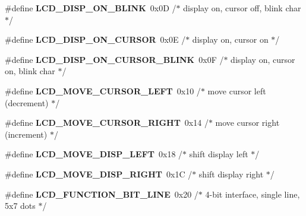 \begin{DoxyCompactItemize}
\item 
\#define {\bfseries L\+C\+D\+\_\+\+D\+I\+S\+P\+\_\+\+O\+N\+\_\+\+B\+L\+I\+NK}~0x0\+D /$\ast$ display on, cursor off, blink char     $\ast$/\hypertarget{a00010_ga470cef85de53e37356b22c66a357a764}{}\label{a00010_ga470cef85de53e37356b22c66a357a764}

\item 
\#define {\bfseries L\+C\+D\+\_\+\+D\+I\+S\+P\+\_\+\+O\+N\+\_\+\+C\+U\+R\+S\+OR}~0x0\+E /$\ast$ display on, cursor on                  $\ast$/\hypertarget{a00010_gaf56b6d6bdb6fa48b26106dee5f74ae1f}{}\label{a00010_gaf56b6d6bdb6fa48b26106dee5f74ae1f}

\item 
\#define {\bfseries L\+C\+D\+\_\+\+D\+I\+S\+P\+\_\+\+O\+N\+\_\+\+C\+U\+R\+S\+O\+R\+\_\+\+B\+L\+I\+NK}~0x0\+F /$\ast$ display on, cursor on, blink char      $\ast$/\hypertarget{a00010_gac1984ed0db15c6991d34c184fdca5dc6}{}\label{a00010_gac1984ed0db15c6991d34c184fdca5dc6}

\item 
\#define {\bfseries L\+C\+D\+\_\+\+M\+O\+V\+E\+\_\+\+C\+U\+R\+S\+O\+R\+\_\+\+L\+E\+FT}~0x10 /$\ast$ move cursor left  (decrement)          $\ast$/\hypertarget{a00010_gac2f0ddce1daaa1bf1a016270a89a264b}{}\label{a00010_gac2f0ddce1daaa1bf1a016270a89a264b}

\item 
\#define {\bfseries L\+C\+D\+\_\+\+M\+O\+V\+E\+\_\+\+C\+U\+R\+S\+O\+R\+\_\+\+R\+I\+G\+HT}~0x14 /$\ast$ move cursor right (increment)          $\ast$/\hypertarget{a00010_ga0ad58e39e053e97d34527fcbe936899b}{}\label{a00010_ga0ad58e39e053e97d34527fcbe936899b}

\item 
\#define {\bfseries L\+C\+D\+\_\+\+M\+O\+V\+E\+\_\+\+D\+I\+S\+P\+\_\+\+L\+E\+FT}~0x18 /$\ast$ shift display left                     $\ast$/\hypertarget{a00010_gab3c34ff1eee238bbe9c677215219fb8e}{}\label{a00010_gab3c34ff1eee238bbe9c677215219fb8e}

\item 
\#define {\bfseries L\+C\+D\+\_\+\+M\+O\+V\+E\+\_\+\+D\+I\+S\+P\+\_\+\+R\+I\+G\+HT}~0x1\+C /$\ast$ shift display right                    $\ast$/\hypertarget{a00010_ga9a90bb926f5ba59378af81fe8e246ffb}{}\label{a00010_ga9a90bb926f5ba59378af81fe8e246ffb}

\item 
\#define {\bfseries L\+C\+D\+\_\+\+F\+U\+N\+C\+T\+I\+O\+N\+\_\+B\+I\+T\+\_\+L\+I\+NE}~0x20 /$\ast$ 4-\/bit interface, single line, 5x7 dots $\ast$/\hypertarget{a00010_gaff4e5baa36a0322eb97557dcb18cd96e}{}\label{a00010_gaff4e5baa36a0322eb97557dcb18cd96e}


\end{DoxyCompactItemize}
